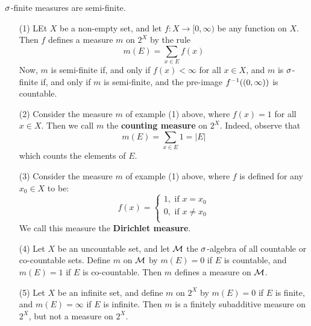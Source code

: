 \begin{lemma}\label{lemma_1.2.1}
    $\sigma$-finite measures are semi-finite.
\end{lemma}

\begin{example}\label{example_1.2}
    \begin{enumerate}
        \item[(1)] LEt $X$ be a non-empty set, and let $f:X \xrightarrow{}
            [0,\infty)$ be any function on $X$. Then $f$ defines a measure $m$
            on  $2^X$ by the rule
            \begin{equation*}
                m(E)=\sum_{x \in E}{f(x)}
            \end{equation*}
        Now, $m$ is semi-finite if, and only if $f(x)<\infty$ for all $x \in  X$,
        and $m$ is  $\sigma$-finite if, and only if $m$ is semi-finite, and the
        pre-image $f^{-1}((0,\infty))$ is countable.

        \item[(2)] Consider the measure $m$ of example (1) above, where $f(x)=1$
            for all $x \in X$. Then we call $m$ the  \textbf{counting measure}
            on $2^X$. Indeed, observe that
            \begin{equation*}
                m(E)=\sum_{x \in E}{1}=|E|
            \end{equation*}
            which counts the elements of $E$.

        \item[(3)] Consider the measure $m$ of example (1) above, where $f$ is
            defined for any  $x_0 \in X$ to be:
            \begin{equation*}
                f(x)=\begin{cases}
                        1, \text{ if } x=x_0 \\
                        0, \text{ if } x \neq x_0 \\
                     \end{cases}
            \end{equation*}
            We call this measure the \textbf{Dirichlet measure}.

        \item[(4)] Let $X$ be an uncountable set, and let $\mathcal{M}$ the $\sigma$-algebra
            of all countable or co-countable sets. Define  $m$ on  $\mathcal{M}$ by
            $m(E)=0$ if $E$ is countable, and $m(E)=1$ if $E$ is co-countable.
            Then $m$ defines a measure on $\mathcal{M}$.

        \item[(5)] Let $X$ be an infinite set, and define $m$ on $2^X$ by
            $m(E)=0$ if $E$ is finite, and $m(E)=\infty$ if $E$ is infinite.
            Then $m$ is a finitely subadditive measure on  $2^X$, but not a
            measure on  $2^X$.
    \end{enumerate}
\end{example}

